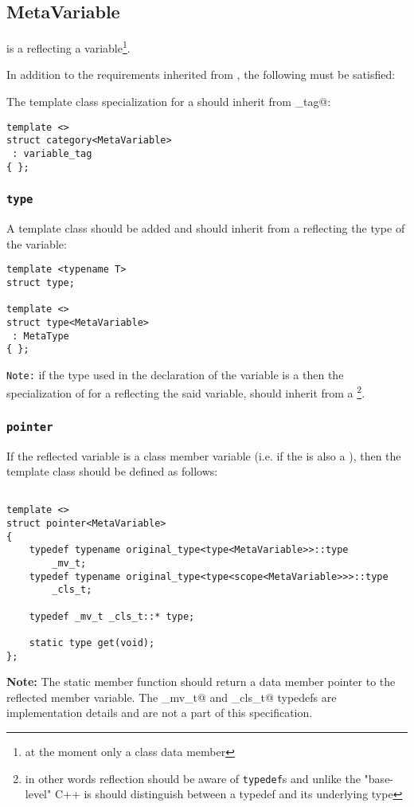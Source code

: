 \subsection{MetaVariable}
\label{concept-MetaVariable}

 is a  reflecting a variable\footnote{
at the moment only a class data member}.

In addition to the requirements inherited from , the following must
be satisfied:

The \verb@category@ template class specialization for a  should
inherit from \verb@variable_tag@:

\begin{verbatim}
template <>
struct category<MetaVariable>
 : variable_tag
{ };
\end{verbatim}

\subsubsection{\texttt{type}}

A template class \verb@type@ should be added and should inherit
from a  reflecting the type of the variable:

\begin{verbatim}
template <typename T>
struct type;

template <>
struct type<MetaVariable>
 : MetaType
{ };
\end{verbatim}

\texttt{Note:} if the type used in the declaration of the variable
is a \verb@typedef@ then the specialization of \verb@type@ for
a  reflecting the said variable, should
inherit from a \footnote{in other words reflection
should be aware of \texttt{typedef}s and unlike the "base-level" C++
is should distinguish between a typedef and its underlying type}.

\subsubsection{\texttt{pointer}}

If the reflected variable is a class member variable (i.e. if the 
is also a ), then the \verb@pointer@ template class should be
defined as follows:

\begin{verbatim}

template <>
struct pointer<MetaVariable>
{
	typedef typename original_type<type<MetaVariable>>::type
		_mv_t;
	typedef typename original_type<type<scope<MetaVariable>>>::type
		_cls_t;

	typedef _mv_t _cls_t::* type;

	static type get(void);
};

\end{verbatim}

\textbf{Note:} The static member function \verb@get@ should return a data member pointer to
the reflected member variable. The \verb@_mv_t@ and \verb@_cls_t@ typedefs
are implementation details and are not a part of this specification.

